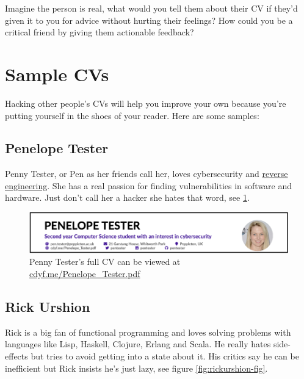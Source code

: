 \documentclass[
]{book}
\begin{document}
Imagine the person is real, what would you tell them about their CV if they'd given it to you for advice without hurting their feelings? How could you be a critical friend by giving them actionable feedback?

\hypertarget{sample-cvs}{%
\section{Sample CVs}\label{sample-cvs}}

Hacking other people's CVs will help you improve your own because you're putting yourself in the shoes of your reader. Here are some samples:

\hypertarget{pen-tester}{%
\subsection{Penelope Tester}\label{pen-tester}}

Penny Tester, or Pen as her friends call her, loves cybersecurity and \href{https://en.wikipedia.org/wiki/Reverse_engineering}{reverse engineering}. She has a real passion for finding vulnerabilities in software and hardware. Just don't call her a hacker she hates that word, see \ref{fig:pentester-fig}.

\begin{figure}

{\centering \includegraphics[width=1\linewidth]{images/pen_tester} 

}

\caption{Penny Tester's full CV can be viewed at \href{https://www.cdyf.me/Penelope_Tester.pdf}{cdyf.me/Penelope\_Tester.pdf}}\label{fig:pentester-fig}
\end{figure}



\hypertarget{rick-urshion}{%
\subsection{Rick Urshion}\label{rick-urshion}}

Rick is a big fan of functional programming and loves solving problems with languages like Lisp, Haskell, Clojure, Erlang and Scala. He really hates side-effects but tries to avoid getting into a state about it. His critics say he can be inefficient but Rick insists he's just lazy, see figure \ref{fig:rickurshion-fig}.
\end{document}
